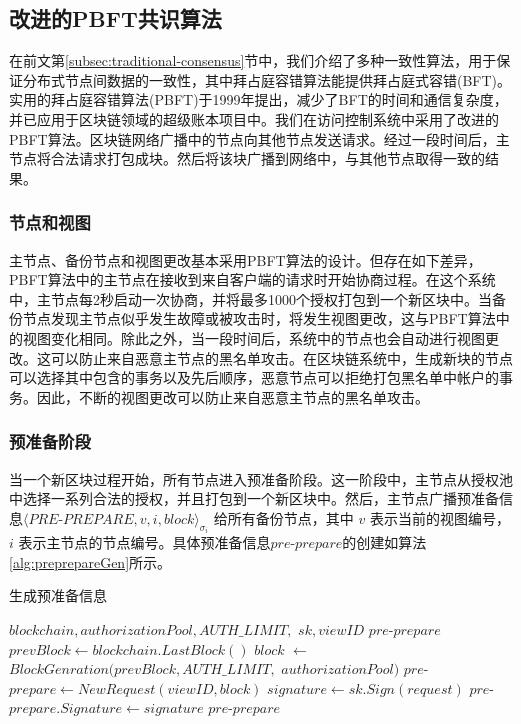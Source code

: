 \subsection{改进的PBFT共识算法}
\label{subsec:adapted-pbft}

在前文第\ref{subsec:traditional-consensus}节中，我们介绍了多种一致性算法，用于保证分布式节点间数据的一致性，其中拜占庭容错算法能提供拜占庭式容错(BFT)。实用的拜占庭容错算法(PBFT)于1999年提出，减少了BFT的时间和通信复杂度，并已应用于区块链领域的超级账本项目中。我们在访问控制系统中采用了改进的PBFT算法。区块链网络广播中的节点向其他节点发送请求。经过一段时间后，主节点将合法请求打包成块。然后将该块广播到网络中，与其他节点取得一致的结果。

\subsubsection{节点和视图}

主节点、备份节点和视图更改基本采用PBFT算法的设计。但存在如下差异，PBFT算法中的主节点在接收到来自客户端的请求时开始协商过程。在这个系统中，主节点每2秒启动一次协商，并将最多1000个授权打包到一个新区块中。当备份节点发现主节点似乎发生故障或被攻击时，将发生视图更改，这与PBFT算法中的视图变化相同。除此之外，当一段时间后，系统中的节点也会自动进行视图更改。这可以防止来自恶意主节点的黑名单攻击。在区块链系统中，生成新块的节点可以选择其中包含的事务以及先后顺序，恶意节点可以拒绝打包黑名单中帐户的事务。因此，不断的视图更改可以防止来自恶意主节点的黑名单攻击。

\subsubsection{预准备阶段}

当一个新区块过程开始，所有节点进入预准备阶段。这一阶段中，主节点从授权池中选择一系列合法的授权，并且打包到一个新区块中。然后，主节点广播预准备信息$\langle PRE$-$PREPARE, v, i, block \rangle_{\sigma_{i}}$ 给所有备份节点，其中 $v$ 表示当前的视图编号，$i$ 表示主节点的节点编号。具体预准备信息$pre$-$prepare$的创建如算法\ref{alg:preprepareGen}所示。

 \begin{algorithm}
 \caption{生成预准备信息}\label{alg:preprepareGen}
   \begin{algorithmic}[H]
   \renewcommand{\algorithmicrequire}{\textbf{Input:}}
   \renewcommand{\algorithmicensure}{\textbf{Output:}}
   \REQUIRE $blockchain, authorizationPool, AUTH\_LIMIT,$ $sk, viewID$
   \ENSURE  $pre$-$prepare$
    \STATE $prevBlock \gets blockchain.LastBlock()$
    \STATE $block$ $\gets$ $BlockGenration(prevBlock, AUTH\_LIMIT,$ $authorizationPool)$
    \STATE $pre$-$prepare \gets NewRequest(viewID, block)$
    \STATE $signature \gets sk.Sign(request)$
    \STATE $pre$-$prepare.Signature \gets signature$
   \RETURN $pre$-$prepare$
   \end{algorithmic}
 \end{algorithm}


